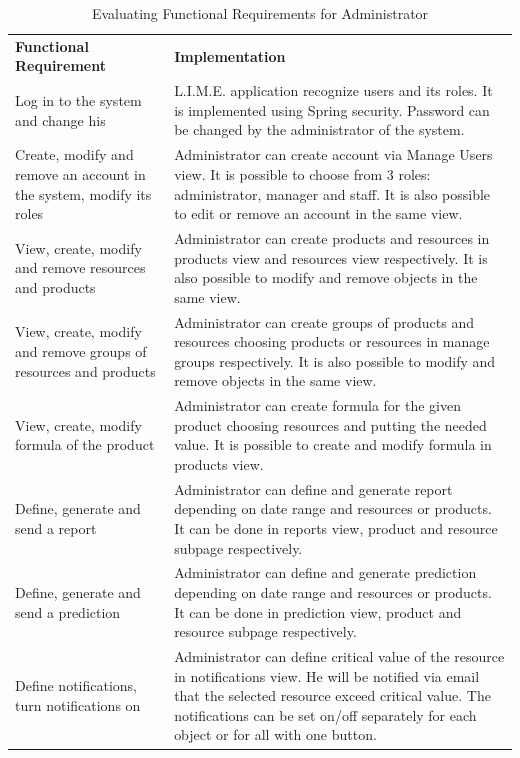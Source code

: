\documentclass[a4paper,11pt,twoside]{report}
\theoremstyle{definition}
\begin{document}
\begin{longtable}{|p{4cm}|p{12cm}|}
\caption[Evaluating Functional Requirements for Administrator]{Evaluating Functional Requirements for Administrator}
\label{Evaluating Functional Requirements for Administrator}
\centering
\tabularnewline

\hline
\textbf{Functional \mbox{Requirement}} & \textbf{Implementation} \\ \hline
Log in to the system and change his & L.I.M.E. application recognize users and its roles. It is implemented using Spring security. Password can be changed by the administrator of the system. \\ \hline
Create, modify and remove an account in the system, modify its roles & Administrator can create account via Manage Users view. It is possible to choose from 3 roles: administrator, manager and staff. It is also possible to edit or remove an account in the same view. \\ \hline
View, create, modify and remove resources and products & Administrator can create products and resources in products view and resources view respectively. It is also possible to modify and remove objects in the same view. \\ \hline
View, create, modify and remove groups of resources and products & Administrator can create groups of products and resources choosing products or resources in manage groups respectively. It is also possible to modify and remove objects in the same view. \\ \hline
View, create, modify formula of the product & Administrator can create formula for the given product choosing resources and putting the needed value. It is possible to create and modify formula in products view. \\ \hline
Define, generate and send a report & Administrator can define and generate report depending on date range and resources or products. It can be done in reports view, product and resource subpage respectively. \\ \hline
Define, generate and send a prediction & Administrator can define and generate prediction depending on date range and resources or products. It can be done in prediction view, product and resource subpage respectively. \\ \hline
Define notifications, turn notifications on & Administrator can define critical value of the resource in notifications view. He will be notified via email that the selected resource exceed critical value. The notifications can be set on/off separately for each object or for all with one button. \\ \hline

\end{longtable}
\end{document}
